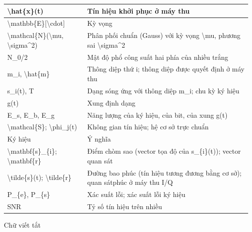 \documentclass[
  10
]{article}
\begin{document}
{\begin{longtable}[]{@{}|l|l|@{}}
\hline
\textbackslash hat\{x\}(t) & Tín hiệu khởi phục ở máy thu \\
\hline
\textbackslash mathbb\{E\}{[}\textbackslash cdot{]} & Kỳ vọng \\
\hline
\textbackslash mathcal\{N\}(\textbackslash mu,
\textbackslash sigma\^{}2) & Phân phối chuẩn (Gauss) với kỳ vọng
\textbackslash mu, phương sai \textbackslash sigma\^{}2 \\
\hline
N\_0/2 & Mật độ phổ công suất hai phía của nhiều trắng \\
\hline
m\_i, \textbackslash hat\{m\} & Thông diệp thứ i; thông diệp được quyết
định ở máy thu \\
\hline
s\_i(t), T & Dạng sóng ứng với thông diệp m\_i; chu kỳ ký hiệu \\
\hline
g(t) & Xung định dạng \\
\hline
E\_s, E\_b, E\_g & Năng lượng của ký hiệu, của bit, của xung g(t) \\
\hline
\textbackslash mathcal\{S\}; \textbackslash phi\_j(t) & Không gian tín
hiệu; hệ cơ sở trực chuẩn \\
\hline
Ký hiệu & Ý nghĩa \\
\hline
\textbackslash mathbf\{s\}\_\{i\}; \textbackslash mathbf\{r\} & Điểm
chòm sao (vector tọa độ của s\_\{i\}(t)); vector quan sát \\
\hline
\textbackslash tilde\{s\}(t); \textbackslash tilde\{r\} & Đường bao phúc
(tín hiệu tương đương bằng cơ sở); quan sátphúc ở máy thu I/Q \\
\hline
P\_\{e\}, P\_\{s\} & Xác suất lỗi; xác suất lỗi ký hiệu \\
\hline
SNR & Tỷ số tín hiệu trên nhiều \\
\hline
\end{longtable}
}

Chữ viết tắt
\end{document}
